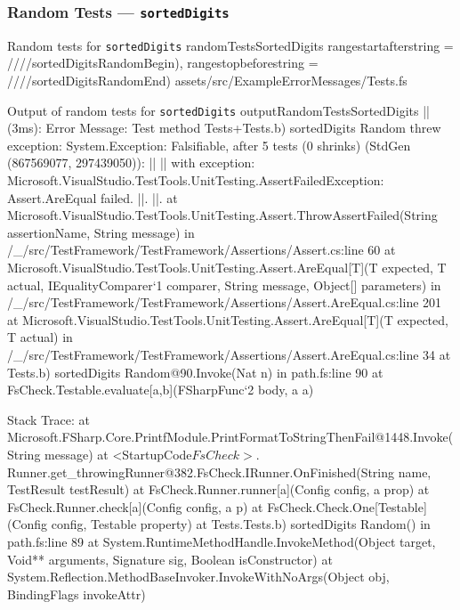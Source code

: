 \newpage %
\subsubsection{Random Tests --- \texttt{sortedDigits}} %


\fsharpinput%
{Random tests for \texttt{sortedDigits}}%
{randomTestsSortedDigits}%
{
	rangestartafterstring = ////sortedDigitsRandomBegin),
	rangestopbeforestring = ////sortedDigitsRandomEnd)
}%
{assets/src/ExampleErrorMessages/Tests.fs}




\begin{fsharpoutput}%
{Output of random tests for \texttt{sortedDigits}}%
{outputRandomTestsSortedDigits}
|| (3ms): Error Message: Test method Tests+Tests.b) sortedDigits Random threw exception:
   System.Exception: Falsifiable, after 5 tests (0 shrinks) (StdGen (867569077, 297439050)):
   ||
   ||
   with exception:
   Microsoft.VisualStudio.TestTools.UnitTesting.AssertFailedException: Assert.AreEqual failed. ||. ||.
	  	at Microsoft.VisualStudio.TestTools.UnitTesting.Assert.ThrowAssertFailed(String assertionName, String message) in /_/src/TestFramework/TestFramework/Assertions/Assert.cs:line 60
	  	at Microsoft.VisualStudio.TestTools.UnitTesting.Assert.AreEqual[T](T expected, T actual, IEqualityComparer`1 comparer, String message, Object[] parameters) in /_/src/TestFramework/TestFramework/Assertions/Assert.AreEqual.cs:line 201
		at Microsoft.VisualStudio.TestTools.UnitTesting.Assert.AreEqual[T](T expected, T actual) in /_/src/TestFramework/TestFramework/Assertions/Assert.AreEqual.cs:line 34
	  	at Tests.b) sortedDigits Random@90.Invoke(Nat n) in path\to\Tests.fs:line 90
	  	at FsCheck.Testable.evaluate[a,b](FSharpFunc`2 body, a a)

   Stack Trace:
		at Microsoft.FSharp.Core.PrintfModule.PrintFormatToStringThenFail@1448.Invoke(String message)
		at <StartupCode$FsCheck>.$Runner.get_throwingRunner@382.FsCheck.IRunner.OnFinished(String name, TestResult testResult)
	  	at FsCheck.Runner.runner[a](Config config, a prop)
	  	at FsCheck.Runner.check[a](Config config, a p)
	  	at FsCheck.Check.One[Testable](Config config, Testable property)
	  	at Tests.Tests.b) sortedDigits Random() in path\to\Tests.fs:line 89
	  	at System.RuntimeMethodHandle.InvokeMethod(Object target, Void** arguments, Signature sig, Boolean isConstructor)
	  	at System.Reflection.MethodBaseInvoker.InvokeWithNoArgs(Object obj, BindingFlags invokeAttr)
\end{fsharpoutput}


